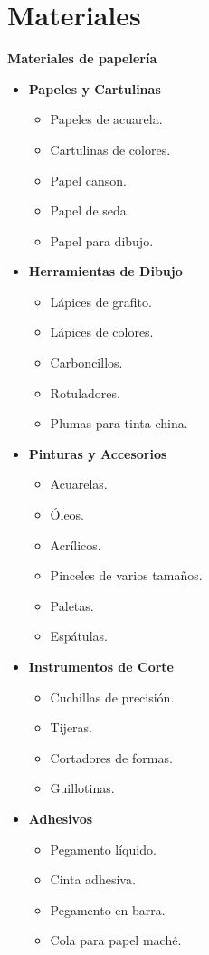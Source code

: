 \newpage
\section{Materiales}
\textbf{Materiales de papelería}
\begin{itemize}
  \item \textbf{Papeles y Cartulinas}
  \begin{itemize}
      \item Papeles de acuarela.
      \item Cartulinas de colores.
      \item Papel canson.
      \item Papel de seda.
      \item Papel para dibujo.
  \end{itemize}
  
  \item \textbf{Herramientas de Dibujo}
  \begin{itemize}
      \item Lápices de grafito.
      \item Lápices de colores.
      \item Carboncillos.
      \item Rotuladores.
      \item Plumas para tinta china.
  \end{itemize}
  
  \item \textbf{Pinturas y Accesorios}
  \begin{itemize}
      \item Acuarelas.
      \item Óleos.
      \item Acrílicos.
      \item Pinceles de varios tamaños.
      \item Paletas.
      \item Espátulas.
  \end{itemize}
  
  \item \textbf{Instrumentos de Corte}
  \begin{itemize}
      \item Cuchillas de precisión.
      \item Tijeras.
      \item Cortadores de formas.
      \item Guillotinas.
  \end{itemize}
  
  \item \textbf{Adhesivos}
  \begin{itemize}
      \item Pegamento líquido.
      \item Cinta adhesiva.
      \item Pegamento en barra.
      \item Cola para papel maché.
  \end{itemize}
  

\end{itemize}
